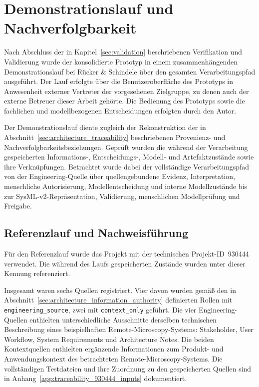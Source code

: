 \section{Demonstrationslauf und Nachverfolgbarkeit}
\label{sec:results}

Nach Abschluss der in Kapitel~\ref{sec:validation} beschriebenen
Verifikation und Validierung wurde der konsolidierte Prototyp in einem
zusammenhängenden Demonstrationslauf bei Rücker \& Schindele über den
gesamten Verarbeitungspfad ausgeführt. Der Lauf erfolgte über die
Benutzeroberfläche des Prototyps in Anwesenheit externer Vertreter der
vorgesehenen Zielgruppe, zu denen auch der externe Betreuer dieser Arbeit
gehörte. Die Bedienung des Prototyps sowie die fachlichen und
modellbezogenen Entscheidungen erfolgten durch den Autor.

Der Demonstrationslauf diente zugleich der Rekonstruktion der in
Abschnitt~\ref{sec:architecture_traceability} beschriebenen Provenienz- und
Nachverfolgbarkeitsbeziehungen. Geprüft wurden die während der Verarbeitung
gespeicherten Informations-, Entscheidungs-, Modell- und Artefaktzustände
sowie ihre Verknüpfungen. Betrachtet wurde dabei der vollständige
Verarbeitungspfad von der Engineering-Quelle über quellengebundene Evidenz,
Interpretation, menschliche Autorisierung, Modellentscheidung und interne
Modellzustände bis zur SysML-v2-Repräsentation, Validierung, menschlichen
Modellprüfung und Freigabe.


\subsection{Referenzlauf und Nachweisführung}
\label{sec:results_traceability}

Für den Referenzlauf wurde das Projekt mit der technischen
Projekt-ID~930444 verwendet. Die während des Laufs gespeicherten Zustände
wurden unter dieser Kennung referenziert.

Insgesamt waren sechs Quellen registriert. Vier davon wurden gemäß den in
Abschnitt~\ref{sec:architecture_information_authority} definierten Rollen
mit \texttt{engineering\_source}, zwei mit \texttt{context\_only} geführt.
Die vier Engineering-Quellen enthielten unterschiedliche Ausschnitte
derselben technischen Beschreibung eines beispielhaften
Remote-Microscopy-Systems: Stakeholder, User Workflow, System Requirements
und Architecture Notes. Die beiden Kontextquellen enthielten ergänzende
Informationen zum Produkt- und Anwendungskontext des betrachteten
Remote-Microscopy-Systems. Die vollständigen Testdateien und ihre Zuordnung
zu den gespeicherten Quellen sind in
Anhang~\ref{app:traceability_930444_inputs} dokumentiert.

